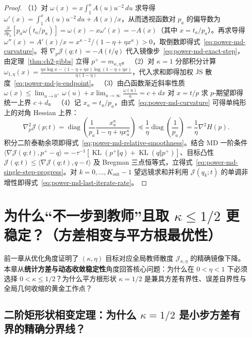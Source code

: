 \documentclass[lang=cn,scheme=chinese,openany]{../book/elegantbook}
\newcommand{\KL}{\operatorname{KL}}
\begin{document}
\begin{proof}
（1）对 $\omega(x)=x\int_1^x A(u)u^{-2}\,du$ 求导得 $\omega'(x)=\int_1^x A(u)u^{-2}\,du+A(x)/x$，从而透视函数对 $p_a$ 的偏导数为 $\frac{\partial}{\partial p_a}[p_a\omega(t_a/p_a)]=\omega(x)-x\omega'(x)=-A(x)$（其中 $x=t_a/p_a$）。再求导得 $\omega''(x)=A'(x)/x=x^{\kappa-2}/(1-\eta+\eta x^\kappa)>0$，取倒数即得式~\eqref{eq:power-md-curvature}。将 $\nabla_p\mathcal J(q;t)=-A(t/q)$ 代入镜像步~\eqref{eq:power-md-exact-step}，由定理~\ref{thm:ch2-gibbs} 立得 $p^+=m_{\kappa,\eta}$。
（2）对 $\kappa=1$ 分部积分计算 $\omega_{1,\eta}(x)=\frac{\eta x\log x-(1-\eta+\eta x)\log(1-\eta+\eta x)}{\eta(1-\eta)}$，代入求和即得加权 JS 散度~\eqref{eq:power-md-js-endpoint}。
（3）由凸函数渐近斜率性质 $\omega(x)\le\lim_{u\to 0^+}\omega(u)+x\lim_{u\to\infty}\frac{\omega(u)}{u}=c+dx$ 对 $x=t/p$ 求 $p$-期望即得统一上界 $c+d$。
（4）记 $x_a=t_a/p_a$，由式~\eqref{eq:power-md-curvature} 可得单纯形上的对角 Hessian 上界：
\begin{equation}
 \nabla_p^2\mathcal J(p;t)
 =\operatorname{diag}\left(\frac1{p_a}
       \frac{x_a^\kappa}{1-\eta+\eta x_a^\kappa}\right)
 \preceq\frac1\eta\operatorname{diag}\left(\frac1{p_a}\right)
 =\frac1\eta\nabla^2 H(p).
 \label{eq:power-md-hessian-bound}
\end{equation}
积分二阶泰勒余项即得式~\eqref{eq:power-md-relative-smoothness}。结合 MD 一阶条件 $\langle\nabla\mathcal J(q;t),p^+-q\rangle=-\tau^{-1}[\KL(p^+\Vert q)+\KL(q\Vert p^+)]$、目标凸性 $\mathcal J(q;t)\le\langle\nabla\mathcal J(q;t),q-t\rangle$ 及 Bregman 三点恒等式，立得式~\eqref{eq:power-md-single-step-progress}。对 $k=0,\ldots,K_{\mathrm{out}}-1$ 望远镜求和并利用 $\mathcal J(q_k;t)$ 的单调非增性即得式~\eqref{eq:power-md-last-iterate-rate}。
\end{proof}


\chapter{为什么“不一步到教师”且取 \texorpdfstring{$\kappa\le 1/2$}{kappa <= 1/2} 更稳定？（方差相变与平方根最优性）}
\label{ch:variance-stability}

前一章从优化角度证明了 $(\kappa,\eta)$ 目标对应全局教师散度 $\mathcal J_{\kappa,\eta}$ 的精确镜像下降。本章从\textbf{统计方差与动态收敛稳定性}角度回答核心问题：为什么在 $0<\eta<1$ 下必须选择 $0<\kappa\le 1/2$？为什么平方根形状 $\kappa=1/2$ 是兼具方差有界性、误差自界性与全局几何收缩的黄金工作点？

\section{二阶矩形状相变定理：为什么 \texorpdfstring{$\kappa=1/2$}{kappa=1/2} 是小步方差有界的精确分界线？}
\label{sec:proximal-teacher-center}
\end{document}
